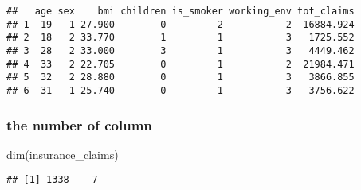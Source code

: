 \documentclass[
]{article}
\newenvironment{Shaded}{\begin{snugshade}}{\end{snugshade}}
\newcommand{\AttributeTok}[1]{\textcolor[rgb]{0.77,0.63,0.00}{#1}}
\newcommand{\FunctionTok}[1]{\textcolor[rgb]{0.00,0.00,0.00}{#1}}
\newcommand{\NormalTok}[1]{#1}
\newcommand{\OtherTok}[1]{\textcolor[rgb]{0.56,0.35,0.01}{#1}}
\newcommand{\SpecialCharTok}[1]{\textcolor[rgb]{0.00,0.00,0.00}{#1}}
\newcommand{\StringTok}[1]{\textcolor[rgb]{0.31,0.60,0.02}{#1}}
\begin{document}
\begin{Shaded}
\end{Shaded}

\begin{verbatim}
##   age sex    bmi children is_smoker working_env tot_claims
## 1  19   1 27.900        0         2           2  16884.924
## 2  18   2 33.770        1         1           3   1725.552
## 3  28   2 33.000        3         1           3   4449.462
## 4  33   2 22.705        0         1           2  21984.471
## 5  32   2 28.880        0         1           3   3866.855
## 6  31   1 25.740        0         1           3   3756.622
\end{verbatim}

\hypertarget{the-number-of-column}{%
\subsubsection{the number of column}\label{the-number-of-column}}

\begin{Shaded}
\begin{Highlighting}[]
\FunctionTok{dim}\NormalTok{(insurance\_claims)}
\end{Highlighting}
\end{Shaded}

\begin{verbatim}
## [1] 1338    7
\end{verbatim}
\end{document}
